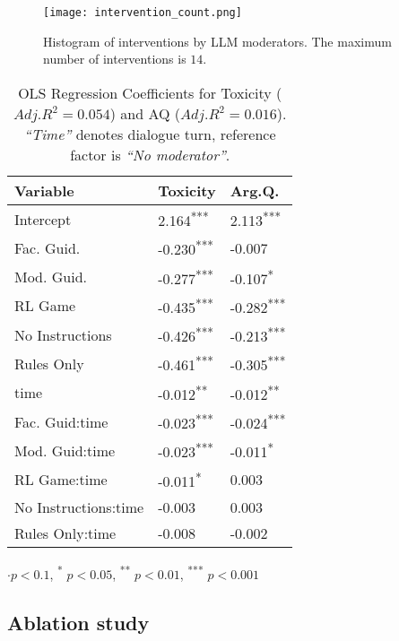\begin{figure}
	\centering
	\texttt{[image: intervention\_count.png]}
	\caption{Histogram of interventions by \ac{LLM} moderators. The maximum number of interventions is $14$.}
	\label{fig::intervention_count}
\end{figure}

\begin{table}[htbp]
    \centering
    \begin{tabular}{lll}
        \toprule
        \textbf{Variable} & \textbf{Toxicity} & \textbf{Arg.Q.} \\
        \midrule
        Intercept & 2.164\textsuperscript{***} & 2.113\textsuperscript{***} \\
        Fac. Guid. & -0.230\textsuperscript{***} & -0.007 \\
        Mod. Guid. & -0.277\textsuperscript{***} & -0.107\textsuperscript{*} \\
        \ac{RL} Game & -0.435\textsuperscript{***} & -0.282\textsuperscript{***} \\
        No Instructions & -0.426\textsuperscript{***} & -0.213\textsuperscript{***} \\
        Rules Only & -0.461\textsuperscript{***} & -0.305\textsuperscript{***} \\
        time & -0.012\textsuperscript{**} & -0.012\textsuperscript{**} \\
        Fac. Guid:time & -0.023\textsuperscript{***} & -0.024\textsuperscript{***} \\
        Mod. Guid:time & -0.023\textsuperscript{***} & -0.011\textsuperscript{*} \\
        \ac{RL} Game:time & -0.011\textsuperscript{*} & 0.003 \\
        No Instructions:time & -0.003 & 0.003 \\
        Rules Only:time & -0.008 & -0.002 \\
        \bottomrule
    \end{tabular}
    \small
    $\cdot p<0.1$, \textsuperscript{*} $p<0.05$, \textsuperscript{**} $p<0.01$, \textsuperscript{***} $p<0.001$
    \normalsize
    \caption{OLS Regression Coefficients for Toxicity ($Adj. R^2=0.054$) and \ac{AQ} ($Adj. R^2=0.016$). \textit{“Time”} denotes dialogue turn, reference factor is \textit{“No moderator”}.}
    \label{tab:timeseries}
\end{table}



\subsection{Ablation study}
\label{ssec:results:ablation}

